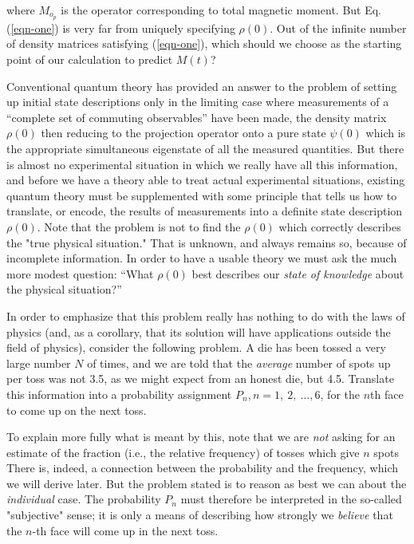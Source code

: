 \documentclass[]{article}
\begin{document}
where \(M_{o_p}\) is the operator corresponding to total magnetic moment. But Eq. (\ref{eqn-one}) is very far from uniquely
specifying \(\rho(0)\). Out of the infinite number of density matrices
satisfying (\ref{eqn-one}), which should we choose as the starting point of our
calculation to predict \(M(t)\)?

Conventional quantum theory has provided an answer to the problem of
setting up initial state descriptions only in the limiting case where
measurements of a ``complete set of commuting observables'' have been
made, the density matrix \(\rho(0)\) then reducing to the projection
operator onto a pure state \(\psi(0)\) which is the appropriate
simultaneous eigenstate of all the measured quantities. But there is
almost no experimental situation in which we really have all this
information, and before we have a theory able to treat actual
experimental situations, existing quantum theory must be supplemented
with some principle that tells us how to translate, or encode, the
results of measurements into a definite state description \(\rho(0)\).
Note that the problem is not to find the \(\rho(0)\) which correctly
describes the "true physical situation." That is unknown, and always
remains so, because of incomplete information. In order to have a usable
theory we must ask the much more modest question: ``What \(\rho(0)\) best
describes our \emph{state of knowledge} about the physical situation?''

In order to emphasize that this problem really has nothing to do with
the laws of physics (and, as a corollary, that its solution will have
applications outside the field of physics), consider the following
problem. A die has been tossed a very large number \(N\) of times, and
we are told that the \emph{average} number of spots up per toss was not
3.5, as we might expect from an honest die, but 4.5. Translate this
information into a probability assignment
\(P_{n},n = 1,\ 2,\ \ldots,6\), for the \(n\)th face to come up on the
next toss.

To explain more fully what is meant by this, note that we are \emph{not} asking
for an estimate of the fraction (i.e., the relative frequency) of tosses
which give \(n\) spots There is, indeed, a connection between the
probability and the frequency, which we will derive later. But the
problem stated is to reason as best we can about the \emph{individual}
case. The probability \(P_{n}\) must therefore be interpreted in the
so-called "subjective" sense; it is only a means of describing how
strongly we \emph{believe} that the \(n\)-th face will come up in the
next toss.
\end{document}

